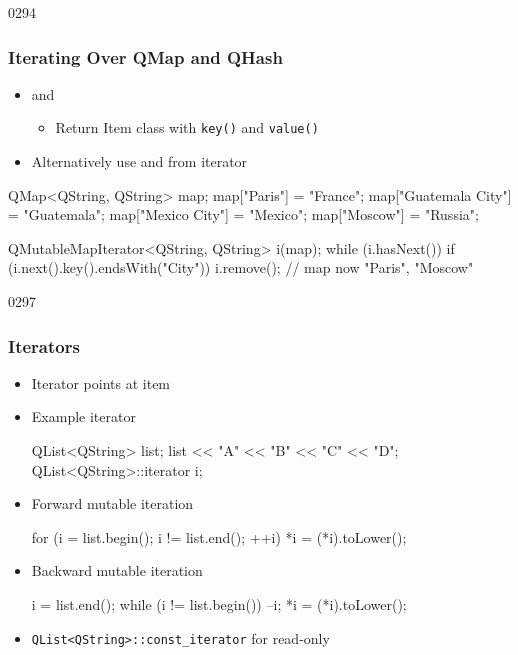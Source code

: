 \begin{slide}[fragile]{0294}\frametitle{Iterating Over QMap and QHash}
\begin{itemize}
\item {} and  
  \begin{itemize}  
  	\item Return Item class  with \texttt{key()} and \texttt{value()}
  \end{itemize}  
\item Alternatively use  and  from iterator
\end{itemize} 
\begin{cpp}
QMap<QString, QString> map;
map["Paris"] = "France";
map["Guatemala City"] = "Guatemala";
map["Mexico City"] = "Mexico";
map["Moscow"] = "Russia";

QMutableMapIterator<QString, QString> i(map);
while (i.hasNext()) {
  if (i.next().key().endsWith("City"))
    i.remove();
}          
// map now "Paris", "Moscow"
\end{cpp}
\end{slide}

\begin{slide}[fragile]{0297}\frametitle{ Iterators}
\vspace*{-4mm}
\begin{itemize}
  \item Iterator points at item
  \item Example  iterator
\begin{cpp}
QList<QString> list;
list << "A" << "B" << "C" << "D";
QList<QString>::iterator i;
\end{cpp}
\item Forward mutable iteration
\begin{cpp}
for (i = list.begin(); i != list.end(); ++i) {
    *i = (*i).toLower();
}
\end{cpp}
\item Backward mutable iteration
\begin{cpp}
i = list.end();
while (i != list.begin()) {
    --i;
    *i = (*i).toLower();
}
\end{cpp}  
\item \lstinline{QList<QString>::const_iterator} for read-only
\end{itemize}
\end{slide}


